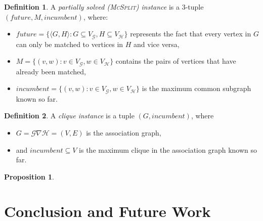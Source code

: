 \documentclass{l4proj}
\newtheorem{proposition}{Proposition}[chapter]
\theoremstyle{definition}
\newtheorem{definition}{Definition}[chapter]
\theoremstyle{remark}
\begin{document}
\begin{definition}
  A \emph{partially solved (\textsc{McSplit}) instance} is a 3-tuple
  $(\textit{future}, M, \textit{incumbent})$, where:
  \begin{itemize}
  \item $\textit{future} = \{ \langle G, H \rangle : G \subseteq
    V_{\mathcal{G}}, H \subseteq V_{\mathcal{H}} \}$ represents the fact that
    every vertex in $G$ can only be matched to vertices in $H$ and vice versa,
  \item $M = \{ (v, w) : v \in V_{\mathcal{G}}, w \in V_{\mathcal{H}} \}$
    contains the pairs of vertices that have already been matched,
  \item $\textit{incumbent} = \{ (v, w) : v \in V_{\mathcal{G}}, w \in
    V_{\mathcal{H}} \}$ is the maximum common subgraph known so far.
  \end{itemize}
\end{definition}


\begin{definition}
  A \emph{clique instance} is a tuple $(G, \textit{incumbent})$, where
  \begin{itemize}
  \item $G = \mathcal{G} \nabla \mathcal{H} = (V, E)$ is the association graph,
  \item and $\textit{incumbent} \subseteq V$ is the maximum clique in the
    association graph known so far.
  \end{itemize}
\end{definition}

\begin{proposition}
  
\end{proposition}

\chapter{Conclusion and Future Work}
\end{document}
